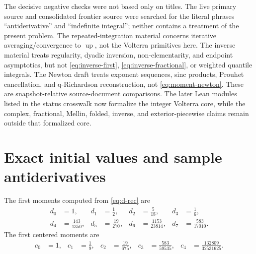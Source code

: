 \documentclass[11pt,oneside]{article}
\theoremstyle{definition}
\theoremstyle{remark}
\newcommand{\Up}{\operatorname{up}}
\newcommand{\1}{\mathbf 1}
\begin{document}
The decisive negative checks were not based only on titles.  The live primary
source and consolidated frontier source were searched for the literal phrases
``antiderivative'' and ``indefinite integral''; neither contains a treatment of
the present problem.  The repeated-integration material concerns iterative
averaging/convergence to \(\Up\), not the Volterra primitives here.  The
inverse material treats regularity, dyadic inversion, non-elementarity, and
endpoint asymptotics, but not \eqref{eq:inverse-first},
\eqref{eq:inverse-fractional}, or weighted quantile integrals.  The Newton draft
treats exponent sequences, sinc products, Prouhet cancellation, and
q-Richardson reconstruction, not \eqref{eq:moment-newton}.  These are
snapshot-relative source-document comparisons.  The later Lean modules listed
in the status crosswalk now formalize the integer Volterra core, while the
complex, fractional, Mellin, folded, inverse, and exterior-piecewise claims
remain outside that formalized core.

\section{Exact initial values and sample antiderivatives}

The first moments computed from \eqref{eq:d-rec} are
\begin{align*}
 d_0&=1,&
 d_1&=\frac12,&
 d_2&=\frac5{18},&
 d_3&=\frac16,\\
 d_4&=\frac{143}{1350},&
 d_5&=\frac{19}{270},&
 d_6&=\frac{1153}{23814},&
 d_7&=\frac{583}{17010}.
\end{align*}
The first centered moments are
\begin{align*}
 c_0&=1,&
 c_1&=\frac19,&
 c_2&=\frac{19}{675},&
 c_3&=\frac{583}{59535},&
 c_4&=\frac{132809}{32531625}.
\end{align*}
\end{document}
